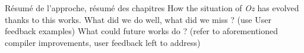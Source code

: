 
Résumé de l'approche, résumé des chapitres
How the situation of \textit{Oz} has evolved thanks to this works.\newline
What did we do well, what did we miss ? (use User feedback examples)\newline
What could future works do ? (refer to aforementioned compiler improvements, user feedback left to address)
